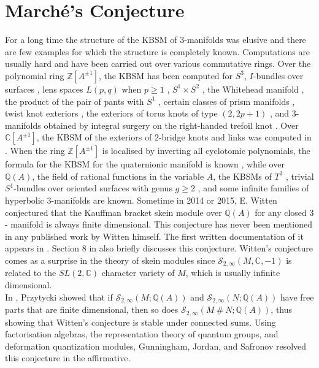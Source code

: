 \documentclass[12pt]{amsproc}
\begin{document}
\section{Marché's Conjecture} 


For a long time the structure of the KBSM of $3$-manifolds was elusive and there are few examples for which the structure is completely known. Computations are usually hard and have been carried out over various commutative rings. Over the polynomial ring $\mathbb{Z}[A^{\pm 1}]$, the KBSM has been computed for $S^3$, $I$-bundles over surfaces \cite{smof3,fundamentals}, lens spaces $L(p,q)$ when $p\geq 1$ \cite{kbsmlens}, $S^1 \times S^2$ \cite{s1s2}, the Whitehead manifold \cite{whitehead}, the product of the pair of pants with $S^1$ \cite{pairofpantss1}, certain classes of prism manifolds \cite{prism}, twist knot exteriors \cite{knotext}, the exteriors of torus knots of type $(2,2p+1)$ \cite{comp22p1}, and $3$-manifolds obtained by integral surgery on the right-handed trefoil knot \cite{trefoilbullock}. Over $\mathbb{C}[A^{\pm1}]$, the KBSM of the exteriors of $2$-bridge knots and links was computed in \cite{2bk, 2bl}. When the ring $\mathbb{Z}[A^{\pm 1}]$ is localised by inverting all cyclotomic polynomials, the formula for the KBSM for the quaternionic manifold is known \cite{quaternion}, while over $\mathbb{Q}(A)$, the field of rational functions in the variable $A$, the KBSMs of $T^3$ \cite{min9,li9}, trivial $S^1$-bundles over oriented surfaces with genus $g \geq 2$ \cite{basissurfacetimess1}, and some infinite families of hyperbolic $3$-manifolds \cite{dethyperbolic} are known. Sometime in 2014 or 2015, E. Witten conjectured that the Kauffman bracket skein module over $\mathbb{Q}(A)$ for any closed $3$- manifold is always finite dimensional. This conjecture has never been mentioned in any published work by Witten himself. The first written documentation of it appears in \cite{min9}.  Section $8$ in \cite{surfacetimess1} also briefly discusses this conjecture. Witten's conjecture comes as a surprise in the theory of skein modules since $\mathcal S_{2,\infty}(M, \mathbb C, -1)$ is related to the $SL(2, \mathbb C)$ character variety of $M$, which is usually infinite dimensional.\\
 
In \cite{connsum}, Przytycki showed that if $\mathcal{S}_{2,\infty}(M; \mathbb{Q}(A))$ and $\mathcal{S}_{2,\infty}(N; \mathbb{Q}(A))$ have free parts that are finite dimensional, then so does $\mathcal{S}_{2,\infty}(M \ \# \ N; \mathbb{Q}(A))$, thus showing that Witten's conjecture is stable under connected sums. Using factorisation algebras, the representation theory of quantum groups, and deformation quantization modules, Gunningham, Jordan, and Safronov resolved this conjecture in the affirmative. 
\end{document}
